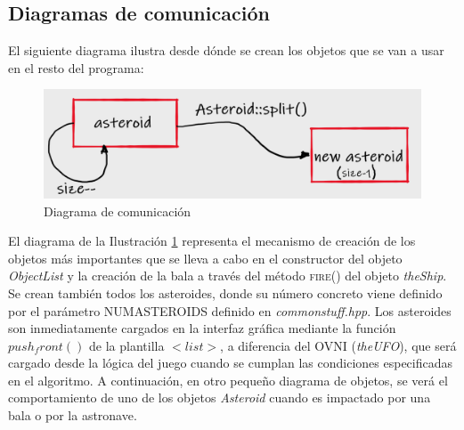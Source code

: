 \subsection{Diagramas de comunicación}

El siguiente diagrama ilustra desde dónde se crean los objetos que se van a usar en el resto del programa:

\begin{figure}[h]
    \centering
    \includegraphics[width=\textwidth]{fotos/asteroid.png}
    \caption{Diagrama de comunicación }
    \label{asteroid}
\end{figure}

El diagrama de la Ilustración \ref{asteroid} representa el mecanismo de creación de los objetos más importantes que se lleva a cabo en el constructor del objeto \emph{ObjectList} y la creación de la bala a través del método \textsc{fire()} del objeto \emph{theShip}. Se crean también todos los asteroides, donde su número concreto viene definido por el parámetro \textsc{NUMASTEROIDS} definido en \emph{commonstuff.hpp}. Los asteroides son inmediatamente cargados en la interfaz gráfica mediante la función $push_front()$ de la plantilla $<list>$, a diferencia del OVNI (\emph{theUFO}), que será cargado desde la lógica del juego cuando se cumplan las condiciones especificadas en el algoritmo.
A continuación, en otro pequeño diagrama de objetos, se verá el comportamiento de uno de los objetos \emph{Asteroid} cuando es impactado por una bala o por la astronave.
